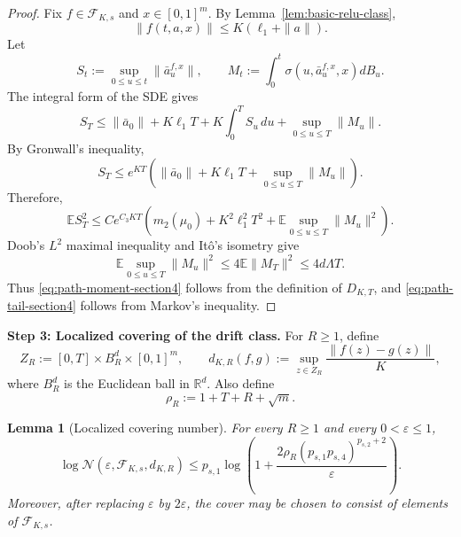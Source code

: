 \documentclass{article}
\newtheorem{lem}[thm]{Lemma}
\newcommand{\1}{\mathbbm{1}}
\numberwithin{equation}{section}
\begin{document}
\begin{proof}
Fix \(f\in\mathcal F_{K,s}\) and \(x\in[0,1]^m\). By Lemma~\ref{lem:basic-relu-class},
\[
 \|f(t,a,x)\|\le K(\ell_1+\|a\|).
\]
Let
\[
 S_t:=\sup_{0\le u\le t}\|\bar a_u^{f,x}\|,
 \qquad
 M_t:=\int_0^t\sigma(u,\bar a_u^{f,x},x)dB_u.
\]
The integral form of the SDE gives
\[
 S_T
 \le
 \|\bar a_0\|+K\ell_1T+K\int_0^T S_u\,du+
 \sup_{0\le u\le T}\|M_u\|.
\]
By Gronwall's inequality,
\[
 S_T
 \le
 e^{KT}\left(\|\bar a_0\|+K\ell_1T+
 \sup_{0\le u\le T}\|M_u\|\right).
\]
Therefore,
\[
 \mathbb E S_T^2
 \le
 C e^{C_3KT}
 \left(m_2(\mu_0)+K^2\ell_1^2T^2+
 \mathbb E\sup_{0\le u\le T}\|M_u\|^2\right).
\]
Doob's \(L^2\) maximal inequality and It\^o's isometry give
\[
 \mathbb E\sup_{0\le u\le T}\|M_u\|^2
 \le
 4\mathbb E\|M_T\|^2
 \le
 4d\Lambda T.
\]
Thus \eqref{eq:path-moment-section4} follows from the definition of \(D_{K,T}\), and \eqref{eq:path-tail-section4} follows from Markov's inequality.
\end{proof}

\medskip
\noindent\textbf{Step 3: Localized covering of the drift class.}
For \(R\ge1\), define
\[
 Z_R:=[0,T]\times B_R^d\times[0,1]^m,
 \qquad
 d_{K,R}(f,g):=\sup_{z\in Z_R}\frac{\|f(z)-g(z)\|}{K},
\]
where \(B_R^d\) is the Euclidean ball in \(\mathbb R^d\). Also define
\begin{equation}
\label{eq:rho-section4}
 \rho_R:=1+T+R+\sqrt m.
\end{equation}

\begin{lem}[Localized covering number]
\label{lem:cover-section4}
For every \(R\ge1\) and every \(0<\varepsilon\le1\),
\begin{equation}
\label{eq:cover-section4}
 \log \mathcal N(\varepsilon,\mathcal F_{K,s},d_{K,R})
 \le
 p_{s,1}\log\left(
 1+\frac{2\rho_R(p_{s,1}p_{s,4})^{p_{s,2}+2}}{\varepsilon}
 \right).
\end{equation}
Moreover, after replacing \(\varepsilon\) by \(2\varepsilon\), the cover may be chosen to consist of elements of \(\mathcal F_{K,s}\).
\end{lem}
\end{document}
